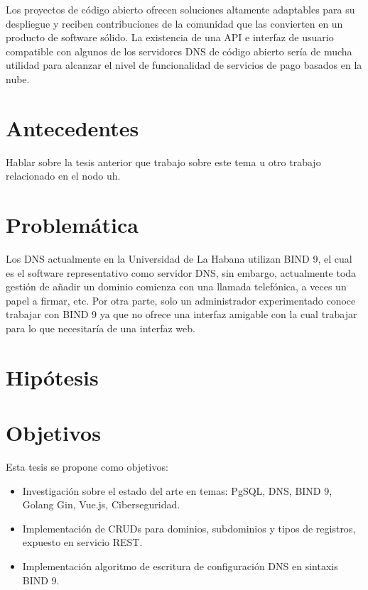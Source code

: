 Los proyectos de código abierto ofrecen soluciones altamente adaptables para su despliegue y reciben contribuciones de la comunidad que las convierten en un producto  de software sólido. La existencia de una API e interfaz de usuario compatible con algunos de los servidores DNS de código abierto sería de mucha utilidad para alcanzar el nivel de funcionalidad de servicios de pago basados en la nube.

\section{Antecedentes}

Hablar sobre la tesis anterior que trabajo sobre este tema u otro trabajo relacionado en el nodo uh.

\section{Problemática}

Los DNS actualmente en la Universidad de La Habana utilizan BIND 9, el cual es el software representativo como servidor DNS, sin embargo, actualmente toda gestión de añadir un dominio comienza con una llamada telefónica, a veces un papel a firmar, etc. Por otra parte, solo un administrador experimentado conoce trabajar con BIND 9 ya que no ofrece una interfaz amigable con la cual trabajar para lo que necesitaría de una interfaz web.

\section{Hipótesis}

\section{Objetivos}
Esta tesis se propone como objetivos:
\begin{itemize}
    \item Investigación sobre el estado del arte en temas: PgSQL, DNS, BIND 9, Golang Gin, Vue.js, Ciberseguridad.
    \item Implementación de CRUDs para dominios, subdominios y tipos de registros, expuesto en servicio REST.
    \item Implementación algoritmo de escritura de configuración DNS en sintaxis BIND 9.
\end{itemize}


